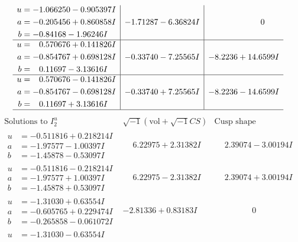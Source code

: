\documentclass[1p]{elsarticle_modified}
\theoremstyle{definition}
\newcommand{\I}{\sqrt{-1}}
\begin{document}
$$\begin{array}{c|c|c}
\begin{aligned}
u &= -1.066250 - 0.905397 I \\
a &= -0.205456 + 0.860858 I \\
b &= -0.84168 - 1.96246 I\end{aligned}
 & -1.71287 - 6.36824 I & \phantom{-0.000000 } 0 \\ \hline\begin{aligned}
u &= \phantom{-}0.570676 + 0.141826 I \\
a &= -0.854767 + 0.698128 I \\
b &= \phantom{-}0.11697 - 3.13616 I\end{aligned}
 & -0.33740 - 7.25565 I & -8.2236 + 14.6599 I \\ \hline\begin{aligned}
u &= \phantom{-}0.570676 - 0.141826 I \\
a &= -0.854767 - 0.698128 I \\
b &= \phantom{-}0.11697 + 3.13616 I\end{aligned}
 & -0.33740 + 7.25565 I & -8.2236 - 14.6599 I\\
 \hline 
 \end{array}$$\newpage$$\begin{array}{c|c|c}  
\text{Solutions to }I^u_{2}& \I (\text{vol} + \sqrt{-1}CS) & \text{Cusp shape}\\
 \hline 
\begin{aligned}
u &= -0.511816 + 0.218214 I \\
a &= -1.97577 - 1.00397 I \\
b &= -1.45878 - 0.53097 I\end{aligned}
 & \phantom{-}6.22975 + 2.31382 I & \phantom{-}2.39074 - 3.00194 I \\ \hline\begin{aligned}
u &= -0.511816 - 0.218214 I \\
a &= -1.97577 + 1.00397 I \\
b &= -1.45878 + 0.53097 I\end{aligned}
 & \phantom{-}6.22975 - 2.31382 I & \phantom{-}2.39074 + 3.00194 I \\ \hline\begin{aligned}
u &= -1.31030 + 0.63554 I \\
a &= -0.605765 + 0.229474 I \\
b &= -0.265858 - 0.061072 I\end{aligned}
 & -2.81336 + 0.83183 I & \phantom{-0.000000 } 0 \\ \hline\begin{aligned}
u &= -1.31030 - 0.63554 I \\

\end{aligned}
\end{array}$$
\end{document}
